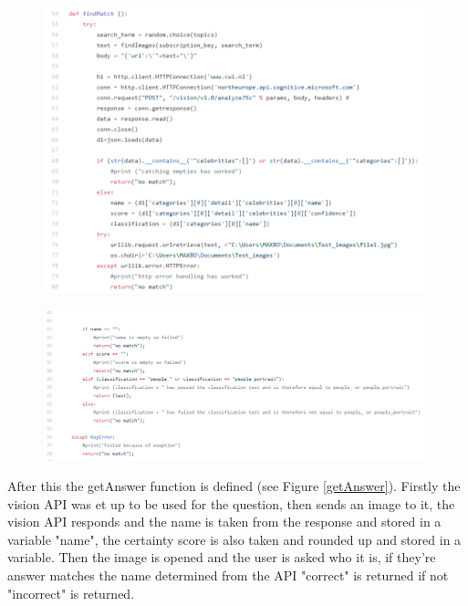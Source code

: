 \documentclass[12pt,a4paper]{article}
\begin{document}
\begin{figure}
\centering
\begin{minipage}{.5\textwidth}
  \centering
  \includegraphics[width=1\linewidth]{Figs/findmatch1.PNG}
  \label{findmatch1}
\end{minipage}%
\begin{minipage}{.5\textwidth}
  \centering
  \includegraphics[width=1\linewidth]{Figs/findmatch2.PNG}
  \label{findmatch2}
\end{minipage}
\end{figure}   

After this the getAnswer function is defined (see Figure \ref{getAnswer}). Firstly the vision API was et up to be used for the question, then sends an image to it, the vision API responds and the name is taken from the response and stored in a variable "name", the certainty score is also taken and rounded up and stored in a variable. Then the image is opened and the user is asked who it is, if they're answer matches the name determined from the API "correct" is returned if not "incorrect" is returned. 
\end{document}
